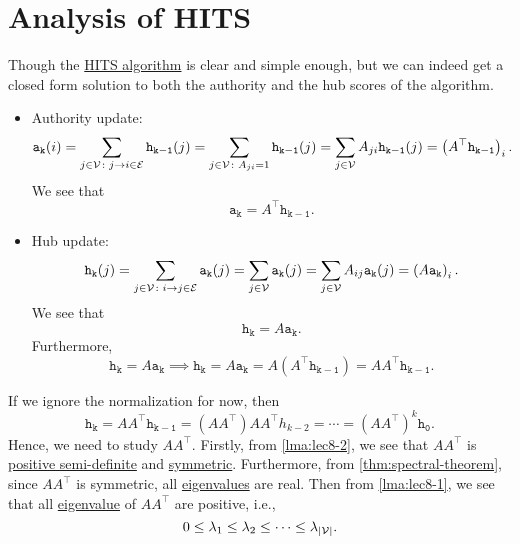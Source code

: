 \section{Analysis of HITS}
Though the \hyperref[algo:HITS-algorithm]{HITS algorithm} is clear and simple enough, but we can indeed get a closed form solution to both the authority and the hub scores of the algorithm.
\begin{itemize}
	\item Authority update:
	      \[
		      \mathtt{a_k(\mathnormal{i})}  = \sum\limits_{j\in \mathcal{V}\colon j\to i\in \mathcal{E}}\mathtt{h_{k-1}(\mathnormal{j})}
		      =\sum\limits_{j\in\mathcal{V}\colon A_{ji} = 1}\mathtt{h_{k-1}(\mathnormal{j})}
		      =\sum\limits_{j\in\mathcal{V}}A_{ji}\mathtt{h_{k-1}(\mathnormal{j})}
		      = \left(A^{\top} \mathtt{h_{k-1}}\right)_i.
	      \]
	      We see that
	      \[
		      \mathtt{a_k} = A^{\top}\mathtt{h_{k-1}}.
	      \]
	\item Hub update:
	      \[
		      \mathtt{h_k(\mathnormal{j})} = \sum\limits_{j\in\mathcal{V}\colon i\to j\in\mathcal{E}} \mathtt{a_k(\mathnormal{j})}
		      = \sum\limits_{j\in\mathcal{V}} \mathtt{a_k(\mathnormal{j})}
		      = \sum\limits_{j\in\mathcal{V} }A_{ij}\mathtt{a_k(\mathnormal{j})}
		      = \left(A\mathtt{a_k}\right)_i.
	      \]
	      We see that
	      \[
		      \mathtt{h_{k}} = A \mathtt{a_{k}}.
	      \]
	      Furthermore,
	      \[
		      \mathtt{h_k} = A\mathtt{a_k}\implies \mathtt{h_k}= A\mathtt{a_k} = A(A^{\top}\mathtt{h_{k-1}}) = A A^{\top} \mathtt{h_{k-1}}.
	      \]
\end{itemize}
If we ignore the normalization for now, then
\[
	\mathtt{h_k} = A A^{\top}\mathtt{h_{k-1}} = (A A^{\top})A A^{\top} h_{k-2} = \cdots = (A A^{\top})^k \mathtt{h_0}.
\]
Hence, we need to study \(A A^{\top}\). Firstly, from \autoref{lma:lec8-2}, we see that \(A A^{\top} \) is \hyperref[def:positive-semi-definite]{positive semi-definite} and \hyperref[def:symmetric-matrix]{symmetric}. Furthermore, from \autoref{thm:spectral-theorem}, since \(A A^{\top} \) is symmetric, all \hyperref[def:eigenvalue]{eigenvalues} are real. Then from \autoref{lma:lec8-1}, we see that all \hyperref[def:eigenvalue]{eigenvalue} of \(A A^{\top} \) are positive, i.e.,
\[
	0 \leq \lambda_1 \leq \lambda_2 \leq \cdots \leq \lambda_{\left\vert \mathcal{\MakeUppercase{v}} \right\vert } .
\]

